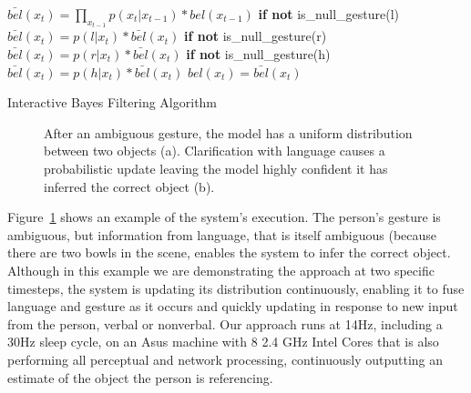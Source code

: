 \documentclass[letterpaper, 10 pt, conference]{ieeeconf}
\begin{document}
\begin{algorithm}
    \DontPrintSemicolon
    \BlankLine
    \BlankLine
     {
      $\bar{bel}(x_t) = \displaystyle\prod_{x_{t-1}} p(x_t|x_{t-1})*bel(x_{t-1})$
      \BlankLine
      \textbf{if not} is\_null\_gesture(l)
      \BlankLine
      \Indp$\bar{bel}(x_t) = p(l | x_t) *  \bar{bel}(x_t)$
      \BlankLine
      \Indm\textbf{if not} is\_null\_gesture(r)
      \BlankLine
      \Indp$\bar{bel}(x_t) = p(r | x_t) *  \bar{bel}(x_t)$
      \BlankLine
      \Indm\textbf{if not} is\_null\_gesture(h)
      \BlankLine
      \Indp$\bar{bel}(x_t) = p(h | x_t) *  \bar{bel}(x_t)$
      \BlankLine
      \Indm{}
      $bel(x_t) = \bar{bel}(x_t)$

    }
    \BlankLine
\caption{Interactive Bayes Filtering Algorithm} 
\label{alg:algorithm}
\end{algorithm}

\begin{figure}
\centering
{}
\caption{After an ambiguous gesture, the model has a uniform
  distribution between two objects (a).  Clarification with language
  causes a probabilistic update leaving the model highly confident it
  has inferred the correct object (b). \label{fig:cartoon}}
\end{figure}

Figure~\ref{fig:cartoon} shows an example of the system's execution.
The person's gesture is ambiguous, but information from language, that
is itself ambiguous (because there are two bowls in the scene, enables
the system to infer the correct object.  Although in this example we
are demonstrating the approach at two specific timesteps, the system
is updating its distribution continuously, enabling it to fuse
language and gesture as it occurs and quickly updating in response to
new input from the person, verbal or nonverbal.  Our approach runs at
14Hz, including a 30Hz sleep cycle, on an Asus machine with 8 2.4 GHz Intel Cores that is also performing all perceptual and network processing, continuously outputting an estimate of the object the person is
referencing.
\end{document}
